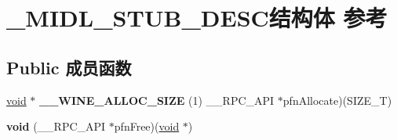 \hypertarget{struct___m_i_d_l___s_t_u_b___d_e_s_c}{}\section{\+\_\+\+M\+I\+D\+L\+\_\+\+S\+T\+U\+B\+\_\+\+D\+E\+S\+C结构体 参考}
\label{struct___m_i_d_l___s_t_u_b___d_e_s_c}
\subsection*{Public 成员函数}
\begin{DoxyCompactItemize}
\item 
\mbox{\label{struct___m_i_d_l___s_t_u_b___d_e_s_c_ac3342a478c4f1603a032b64974be721d}} 
\hyperlink{interfacevoid}{void} $\ast$ {\bfseries \+\_\+\+\_\+\+W\+I\+N\+E\+\_\+\+A\+L\+L\+O\+C\+\_\+\+S\+I\+ZE} (1) \+\_\+\+\_\+\+R\+P\+C\+\_\+\+A\+PI $\ast$pfn\+Allocate)(S\+I\+Z\+E\+\_\+T)
\item 
\mbox{\label{struct___m_i_d_l___s_t_u_b___d_e_s_c_a4f432fb667e944245d1d8ba31b8dc5d5}} 
{\bfseries void} (\+\_\+\+\_\+\+R\+P\+C\+\_\+\+A\+PI $\ast$pfn\+Free)(\hyperlink{interfacevoid}{void} $\ast$)
\end{DoxyCompactItemize}
